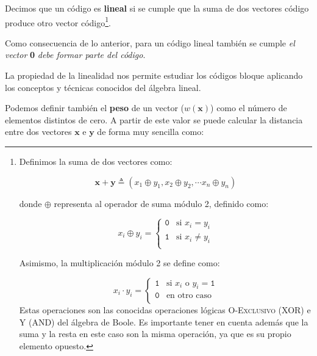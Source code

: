 \documentclass[es,apuntes]{uah}
\begin{document}
Decimos que un código es {\bf lineal} si se cumple que la suma de dos vectores código produce otro vector código\footnote{Definimos la suma de dos vectores como: 

\begin{displaymath}
	\mathbf{x} + \mathbf{y} \triangleq (x_1 \oplus y_1, x_2 \oplus y_2, \cdots x_n \oplus y_n )
\end{displaymath}

donde $\oplus$ representa al operador de suma módulo 2, definido como:

\begin{displaymath}
	x_i \oplus y_i = \left \{ 
	\begin{array}{cl} 
		\mathtt{0} & \mathrm{si}\,\, x_i = y_i\\
 		\mathtt{1} & \mathrm{si} \,\, x_i \neq y_i \\ 
 	\end{array} 	\right.
\end{displaymath}

Asimismo, la multiplicación módulo 2 se define como:

\begin{displaymath}
	x_i \cdot y_i = \left \{ \begin{array}{cl}
 		\mathtt{1} & \mathrm{si} \,\, x_i \,\, \mathrm{o} \,\, y_i = \mathtt{1}\\
 		\mathtt{0} & \mathrm{en\,\, otro\,\, caso}\\	
 \end{array} \right.
\end{displaymath}
Estas operaciones son las conocidas operaciones lógicas \textsc{O-Exclusivo (XOR)} e \textsc{Y (AND)} del álgebra de Boole. 
Es importante tener en cuenta además que la suma y la resta en este caso son la misma operación, ya que  es su propio elemento opuesto. }.



Como consecuencia de lo anterior, para un código lineal también se cumple \textit{el vector} \textbf{0} \textit{debe formar parte del código}.

La propiedad de la linealidad nos permite estudiar los códigos bloque aplicando los conceptos y técnicas conocidos del álgebra lineal. 

Podemos definir también el {\bf peso} de un vector ($w(\mathbf{x})$) como el número de elementos distintos de cero. A partir de este valor se puede calcular la distancia entre dos vectores $\mathbf{x}$ e $\mathbf{y}$ de forma muy sencilla como:
\end{document}
